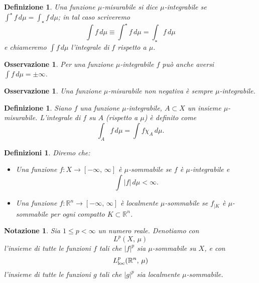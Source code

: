\documentclass[a4paper,10pt,openright,oneside]{book}
\theoremstyle{theoremstyle}
\theoremstyle{theoremstylewoheader}
\theoremstyle{theoremstyle}
\newtheorem{definizione}[teorema]{Definizione}
\newtheorem{definizioni}[teorema]{Definizioni}
\newtheorem{notazione}[teorema]{Notazione}
\newtheorem{osservazione}[teorema]{Osservazione}
\theoremstyle{proofsecstyle}
\theoremstyle{nonumberplain}
\newcommand{\RR}{\ensuremath{\mathbb{R}}}
\newcommand{\abs}[1]{\ensuremath{\lvert #1 \rvert}}
\begin{document}
\begin{definizione}
\label{def:funzione_integrabile}
Una funzione $\mu$-misurabile si dice \emph{$\mu$-integrabile} se $\int^\star f\, d\mu = \int_\star f\, d\mu$; in tal caso scriveremo 
\[
\int f\, d\mu \equiv \int^\star f\, d\mu = \int_\star f\, d\mu
\]
e chiameremo $\int f\, d\mu$ l'\emph{integrale} di $f$ rispetto a $\mu$.
\end{definizione}

\begin{osservazione}
Per una funzione $\mu$-integrabile $f$ può anche aversi $\int f\, d\mu = \pm\infty$.
\end{osservazione}

\begin{osservazione}
\label{oss:funzione_misurabile_non_negativa_est_integrabile}
Una funzione $\mu$-misurabile non negativa è sempre $\mu$-integrabile.
\end{osservazione}

\begin{definizione}
Siano $f$ una funzione $\mu$-integrabile, $A \subset X$ un insieme $\mu$-misurabile. L'integrale di $f$ \emph{su $A$} (rispetto a $\mu$) è definito come
\[
\int_A f\, d\mu = \int f\chi_A\, d\mu.
\]
\end{definizione}

\begin{definizioni}
\label{def:funzione_sommabile}
Diremo che:
\begin{itemize}
\item[(i)] Una funzione $f : X \rightarrow [-\infty,\, \infty]$ è \emph{$\mu$-sommabile} se $f$ è $\mu$-integrabile e
\[
\int |f|\, d\mu < \infty.
\]
\item[(ii)] Una funzione $f : \RR^n \rightarrow [-\infty,\, \infty]$ è \emph{localmente $\mu$-sommabile} se $f_{|K}$ è $\mu$-sommabile per ogni compatto $K \subset \RR^n$.
\end{itemize}
\end{definizioni}

\begin{notazione}
Sia $1 \le p < \infty$ un numero reale. Denotiamo con
\[
L^p (X,\, \mu)
\]
l'insieme di tutte le funzioni $f$ tali che $\abs{f}^p$ sia $\mu$-sommabile su $X$, e con
\[
L_\textup{loc}^p (\RR^n,\, \mu)
\]
l'insieme di tutte le funzioni $g$ tali che $\abs{g}^p$ sia localmente $\mu$-sommabile.
\end{notazione}
\end{document}
